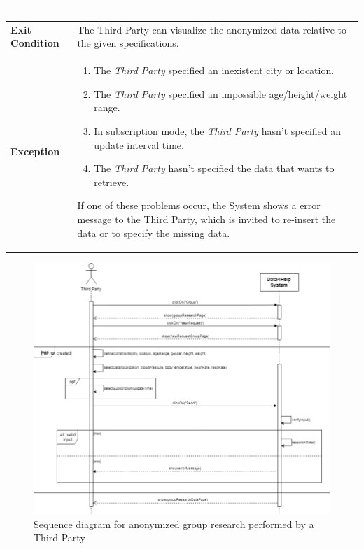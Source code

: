 \begin{table}[H]
\begin{tabular}{|p{3.5cm}|p{10.3cm}|}
\begin{enumerate}[leftmargin=0.5cm]
                                          \end{enumerate}
    										\\
    \hline
    \textbf{\large{Exit Condition}} 	& The Third Party can visualize the                                         anonymized data relative to the given                                       specifications. \\
    
    \hline
    \textbf{\large{Exception}} 			& \begin{enumerate}[leftmargin=0.5cm]                                           \item The \emph{Third Party}                                            specified an inexistent city or                                             location.
                                            \item The \emph{Third Party} specified an impossible age/height/weight range.
                                            \item In subscription mode, the \emph{Third Party} hasn't specified an update interval time.
                                            \item The \emph{Third Party} hasn't specified the data that wants to retrieve.
    \end{enumerate}
    										If one of these problems occur, the System shows a error message to the Third Party, which is invited to re-insert the data or to specify the missing data.
    
    \hline
    
    \end{tabular}
	
\end{table}
\begin{figure}[H]
    \centering
    \includegraphics[scale=0.4]{rasdL/Pictures/groupResearchSeqDiag.png}
    \caption{Sequence diagram for anonymized group research performed by a Third Party}
    
\end{figure}
